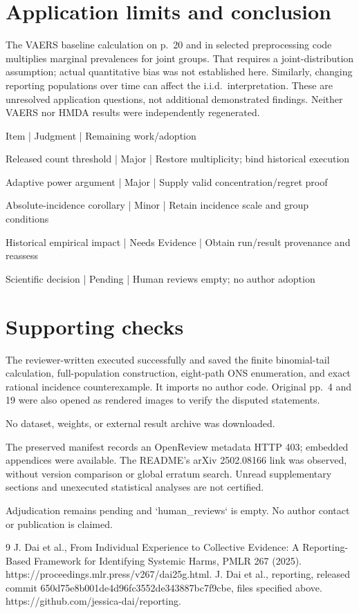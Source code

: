\documentclass[10pt]{article}
\begin{document}
\section*{Application limits and conclusion}
The VAERS baseline calculation on p. 20 and in selected preprocessing code multiplies marginal prevalences for joint groups. That requires a joint-distribution assumption; actual quantitative bias was not established here. Similarly, changing reporting populations over time can affect the i.i.d. interpretation. These are unresolved application questions, not additional demonstrated findings. Neither VAERS nor HMDA results were independently regenerated.\par
Item | Judgment | Remaining work/adoption\par
Released count threshold | Major | Restore multiplicity; bind historical execution\par
Adaptive power argument | Major | Supply valid concentration/regret proof\par
Absolute-incidence corollary | Minor | Retain incidence scale and group conditions\par
Historical empirical impact | Needs Evidence | Obtain run/result provenance and reassess\par
Scientific decision | Pending | Human reviews empty; no author adoption\par
\section*{Supporting checks}
The reviewer-written executed successfully and saved the finite binomial-tail calculation, full-population construction, eight-path ONS enumeration, and exact rational incidence counterexample. It imports no author code. Original pp. 4 and 19 were also opened as rendered images to verify the disputed statements.\par
No dataset, weights, or external result archive was downloaded.\par
The preserved manifest records an OpenReview metadata HTTP 403; embedded appendices were available. The README’s arXiv 2502.08166 link was observed, without version comparison or global erratum search. Unread supplementary sections and unexecuted statistical analyses are not certified.\par
Adjudication remains pending and `human\_reviews` is empty. No author contact or publication is claimed.\par
9 J. Dai et al., From Individual Experience to Collective Evidence: A Reporting-Based Framework for Identifying Systemic Harms, PMLR 267 (2025). https://proceedings.mlr.press/v267/dai25g.html. J. Dai et al., reporting, released commit 650d75e8b001de4d96fc3552de343887bc7f9cbe, files specified above. https://github.com/jessica-dai/reporting.\par
\end{document}
